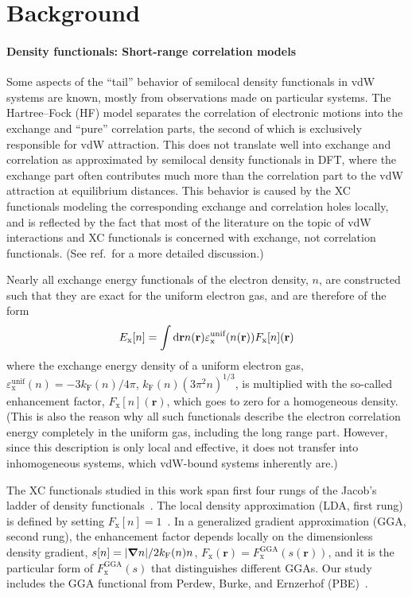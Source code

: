 \section{Background}

\paragraph{Density functionals: Short-range correlation models}

Some aspects of the ``tail'' behavior of semilocal density functionals in vdW systems are known, mostly from observations made on particular systems.
The Hartree--Fock (HF) model separates the correlation of electronic motions into the exchange and ``pure'' correlation parts, the second of which is exclusively responsible for vdW attraction.
This does not translate well into exchange and correlation as approximated by semilocal density functionals in DFT, where the exchange part often contributes much more than the correlation part to the vdW attraction at equilibrium distances.
This behavior is caused by the XC functionals modeling the corresponding exchange and correlation holes locally, and is reflected by the fact that most of the literature on the topic of vdW interactions and XC functionals is concerned with exchange, not correlation functionals.
(See ref.\,\cite{PengPRX16} for a more detailed discussion.)

Nearly all exchange energy functionals of the electron density, $n$, are constructed such that they are exact for the uniform electron gas, and are therefore of the form
\begin{equation}
  E_\mathrm x[n]=\int\mathrm d\mathbf rn(\mathbf r)\varepsilon^\text{unif}_\text x(n(\mathbf r))F_\mathrm x[n](\mathbf r)
  \label{eq:exchange-form}
\end{equation}
where the exchange energy density of a uniform electron gas, $\varepsilon^\text{unif}_\mathrm x(n)=-3k_\mathrm F(n)/4\pi$, $k_\mathrm F(n)(3\pi^2n)^{1/3}$, is multiplied with the so-called enhancement factor, $F_\mathrm x[n](\mathbf r)$, which goes to zero for a homogeneous density.
(This is also the reason why all such functionals describe the electron correlation energy completely in the uniform gas, including the long range part.
However, since this description is only local and effective, it does not transfer into inhomogeneous systems, which vdW-bound systems inherently are.)

The XC functionals studied in this work span first four rungs of the Jacob's ladder of density functionals~\cite{PerdewACP01}.
The local density approximation (LDA, first rung) is defined by setting $F_\mathrm x[n]=1$~\cite{DiracMPCPS30}.
In a generalized gradient approximation (GGA, second rung), the enhancement factor depends locally on the dimensionless density gradient, $s[n]=\lvert\boldsymbol\nabla n\rvert/2k_\text F(n)n$, $F_\mathrm x(\mathbf r)=F^\text{GGA}_\mathrm x(s(\mathbf r))$, and it is the particular form of $F^\text{GGA}_\mathrm x(s)$ that distinguishes different GGAs.
Our study includes the GGA functional from Perdew, Burke, and Ernzerhof (PBE)~\cite{PerdewPRL96}.

